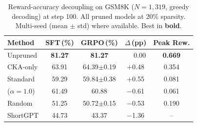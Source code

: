 \begin{table}[t]
\centering
\small
\caption{Reward-accuracy decoupling on GSM8K ($N{=}1{,}319$, greedy decoding) at step 100. All pruned models at 20\% sparsity. Multi-seed (mean $\pm$ std) where available. Best in \textbf{bold}.}
\label{tab:decoupling}
\setlength{\tabcolsep}{4pt}
\begin{tabular}{@{}lcccc@{}}
\toprule
Method & SFT\,(\%) & GRPO\,(\%) & $\Delta$\,(pp) & Peak Rew. \\
\midrule
Unpruned & \textbf{81.27} & \textbf{81.27} & $\phantom{-}$0.00 & \textbf{0.669} \\
CKA-only & 63.91 & 64.39{\scriptsize$\pm$0.19} & $+$0.48 & 0.354 \\
Standard & 59.29 & 59.84{\scriptsize$\pm$0.38} & $+$0.55 & 0.081 \\
\rasp{} ($\alpha{=}1.0$) & 61.49 & 60.88 & $-$0.61 & 0.061 \\
Random & 51.25 & 50.72{\scriptsize$\pm$0.15} & $-$0.53 & 0.190 \\
\midrule
ShortGPT & 44.73 & 43.37 & $-$1.36 & -- \\
\bottomrule
\end{tabular}
\end{table}
